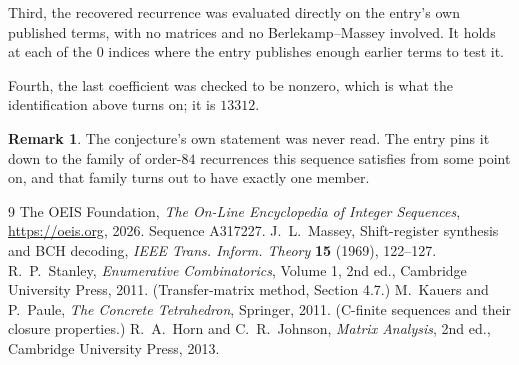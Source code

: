 \documentclass[11pt,a4paper]{article}
\theoremstyle{plain}
\theoremstyle{definition}
\newtheorem{remark}[theorem]{Remark}
\begin{document}
Third, the recovered recurrence was evaluated directly on the entry's own published terms, with
no matrices and no Berlekamp--Massey involved. It holds at each of the $0$ indices where
the entry publishes enough earlier terms to test it.

Fourth, the last coefficient was checked to be nonzero, which is what the identification above
turns on; it is $13312$.

\begin{remark}
The conjecture's own statement was never read. The entry pins it down to the family of
order-$84$ recurrences this sequence satisfies from some point on, and that family turns
out to have exactly one member.
\end{remark}

\begin{thebibliography}{9}
 The OEIS Foundation, \emph{The On-Line Encyclopedia of Integer
Sequences}, \url{https://oeis.org}, 2026. Sequence A317227.
 J.~L.~Massey, Shift-register synthesis and BCH decoding, \emph{IEEE
Trans. Inform. Theory} \textbf{15} (1969), 122--127.
 R.~P.~Stanley, \emph{Enumerative Combinatorics}, Volume 1, 2nd ed.,
Cambridge University Press, 2011. (Transfer-matrix method, Section 4.7.)
 M.~Kauers and P.~Paule, \emph{The Concrete Tetrahedron}, Springer, 2011.
(C-finite sequences and their closure properties.)
 R.~A.~Horn and C.~R.~Johnson, \emph{Matrix Analysis}, 2nd ed., Cambridge
University Press, 2013.
\end{thebibliography}
\end{document}
